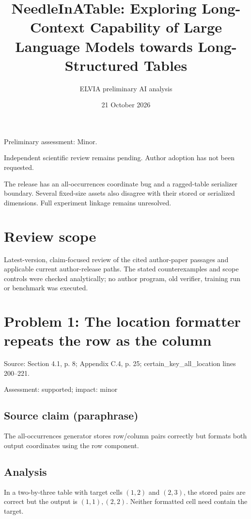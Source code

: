 \documentclass[11pt]{article}
\begin{document}
\title{NeedleInATable: Exploring Long-Context Capability of Large Language Models towards Long-Structured Tables}

\author{ELVIA preliminary AI analysis}\date{21 October 2026}\maketitle

Preliminary assessment: Minor.\par

Independent scientific review remains pending. Author adoption has not been requested.

The release has an all-occurrences coordinate bug and a ragged-table serializer boundary. Several fixed-size assets also disagree with their stored or serialized dimensions. Full experiment linkage remains unresolved.

\section*{Review scope}

Latest-version, claim-focused review of the cited author-paper passages and applicable current author-release paths. The stated counterexamples and scope controls were checked analytically; no author program, old verifier, training run or benchmark was executed.

\section*{Problem 1: The location formatter repeats the row as the column}

Source: Section 4.1, p. 8; Appendix C.4, p. 25; certain\_key\_all\_location lines 200–221.

Assessment: supported; impact: minor

\subsection*{Source claim (paraphrase)}

The all-occurrences generator stores row/column pairs correctly but formats both output coordinates using the row component.

\subsection*{Analysis}

In a two-by-three table with target cells \((1,2)\) and \((2,3)\), the stored pairs are correct but the output is \((1,1),(2,2)\). Neither formatted cell need contain the target.
\end{document}
